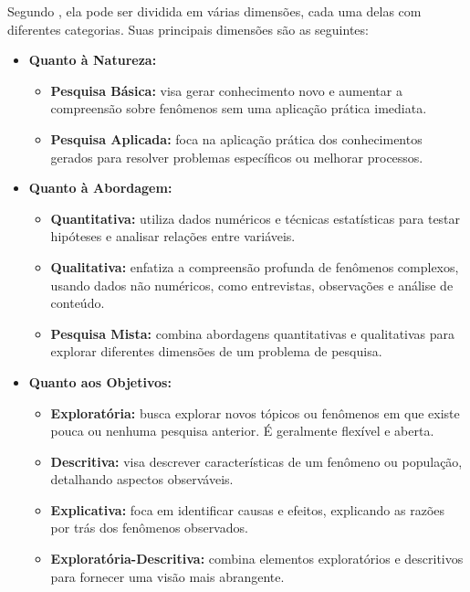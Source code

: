 Segundo , ela pode ser dividida em várias dimensões, cada uma delas com diferentes categorias. Suas principais dimensões são as seguintes:
\begin{itemize}[itemsep=0pt, leftmargin=2.3cm]
    \item \textbf{Quanto à Natureza:}
        \begin{itemize}[itemsep=0pt]
            \item \textbf{Pesquisa Básica:} visa gerar conhecimento novo e aumentar a compreensão sobre fenômenos sem uma aplicação prática imediata.
            \item \textbf{Pesquisa Aplicada:} foca na aplicação prática dos conhecimentos gerados para resolver problemas específicos ou melhorar processos.
        \end{itemize}
    \item \textbf{Quanto à Abordagem:}
        \begin{itemize}[itemsep=0pt]
            \item \textbf{Quantitativa:} utiliza dados numéricos e técnicas estatísticas para testar hipóteses e analisar relações entre variáveis.
            \item \textbf{Qualitativa:} enfatiza a compreensão profunda de fenômenos complexos, usando dados não numéricos, como entrevistas, observações e análise de conteúdo.
            \item \textbf{Pesquisa Mista:} combina abordagens quantitativas e qualitativas para explorar diferentes dimensões de um problema de pesquisa.
        \end{itemize}
    \item \textbf{Quanto aos Objetivos:}
        \begin{itemize}[itemsep=0pt]
            \item \textbf{Exploratória:} busca explorar novos tópicos ou fenômenos em que existe pouca ou nenhuma pesquisa anterior. É geralmente flexível e aberta.
            \item \textbf{Descritiva:} visa descrever características de um fenômeno ou população, detalhando aspectos observáveis.
            \item \textbf{Explicativa:} foca em identificar causas e efeitos, explicando as razões por trás dos fenômenos observados.
            \item \textbf{Exploratória-Descritiva:} combina elementos exploratórios e descritivos para fornecer uma visão mais abrangente.
        \end{itemize}

\end{itemize}
